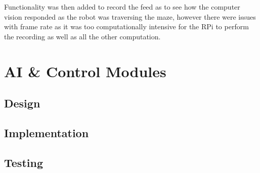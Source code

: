 Functionality was then added to record the feed as to see how the computer vision responded as the robot was traversing the maze, however there were issues with frame rate as it was too computationally intensive for the RPi to perform the recording as well as all the other computation. 

\section{AI \& Control Modules}\label{soft/ai}

\subsection{Design}\label{soft/ai/design}

\subsection{Implementation}\label{soft/ai/impl}

\subsection{Testing}\label{soft/ai/test}